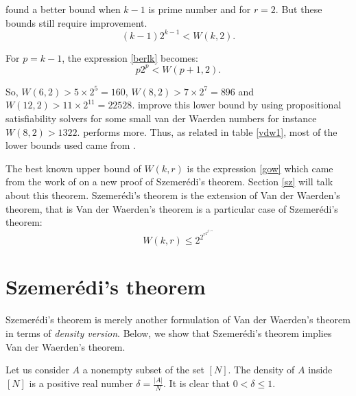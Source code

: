 \cite{brk1968} found a better bound when $k-1$ is prime number  and for $r=2$. But these bounds still  require improvement. 
 \begin{equation}
 (k-1)2^{k-1}<W(k,2). \label{berlk}
 \end{equation}

For $p=k-1$, the expression \eqref{berlk} becomes:
 \begin{equation}
 p2^{p}<W(p+1,2). \label{berlk1}
\end{equation}

So, $W(6,2) >5 \times 2^5=160$, $W(8,2) >7 \times 2^7= 896$ and $W(12,2) >11 \times 2^11= 22528.$
\citep{dransfield2004} improve this lower bound by using propositional satisfiability solvers  for some small van der Waerden numbers for instance $W( 8,2) > 1322$. \cite{rabung2012} performs more. Thus, as related in table \eqref{vdw1}, most of the lower bounds used came from \cite{rabung2012}.

The best known upper bound of $W(k,r)$ is the expression  \eqref{gow} which came from the work of \cite{gowers2001new} on a  new proof of Szemerédi's theorem. Section \eqref{sz} will talk about this theorem. Szemerédi's theorem is the extension of Van der Waerden's theorem, that is Van der Waerden's theorem is a particular case of Szemerédi's theorem:
\begin{equation}
W(k,r) \leq 2^{2^{r^{2^{2^{k+9}}}}}     \label{gow}
\end{equation}




\section{Szemerédi's theorem} \label{sz}

Szemerédi's theorem is merely another formulation of Van der Waerden's theorem in terms of \textit{density version}. Below, we show that Szemerédi's theorem implies Van der Waerden's theorem.

Let us consider $A$ a nonempty subset of the set $[N]$. The density of $A$ inside $[N]$ is a positive real number $\delta=\frac{|A|}{N}$. It is clear that $0< \delta \leq 1.$ 

